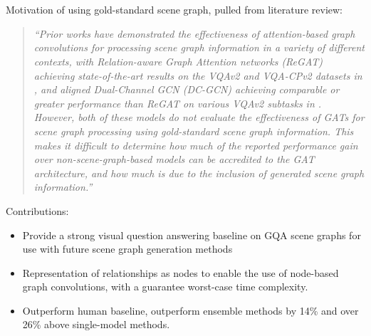 \chapter*{}

{\color{red}
Motivation of using gold-standard scene graph, pulled from literature review:

\begin{quote}
    \textit{``Prior works have demonstrated the effectiveness of attention-based graph convolutions for processing scene graph information in a variety of different contexts, with Relation-aware Graph Attention networks (ReGAT) \cite{li2019relation} achieving state-of-the-art results on the VQAv2 and VQA-CPv2 datasets in \citeyear{li2019relation}, and aligned Dual-Channel GCN (DC-GCN) \cite{huang2020aligned} achieving comparable or greater performance than ReGAT on various VQAv2 subtasks in \citeyear{huang2020aligned}. However, both of these models do not evaluate the effectiveness of GATs for scene graph processing using gold-standard scene graph information. This makes it difficult to determine how much of the reported performance gain over non-scene-graph-based models can be accredited to the GAT architecture, and how much is due to the inclusion of generated scene graph information.''}
\end{quote}

Contributions:

\begin{itemize}
    \item Provide a strong visual question answering baseline on GQA scene graphs for use with future scene graph generation methods
    \item Representation of relationships as nodes to enable the use of node-based graph convolutions, with a guarantee worst-case time complexity.
    \item Outperform human baseline, outperform ensemble methods by 14\% and over 26\% above single-model methods.
\end{itemize}
}